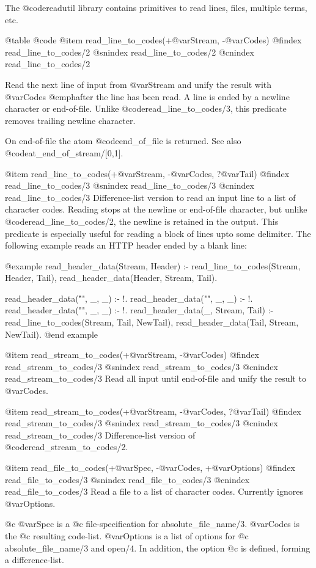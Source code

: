{{{{{{{{{The @code{readutil} library contains primitives to read lines, files,
multiple terms, etc.

@table @code
@item read_line_to_codes(+@var{Stream}, -@var{Codes})
@findex read_line_to_codes/2
@snindex read_line_to_codes/2
@cnindex read_line_to_codes/2

Read the next line of input from @var{Stream} and unify the result with
@var{Codes} @emph{after} the line has been read.  A line is ended by a
newline character or end-of-file. Unlike @code{read_line_to_codes/3},
this predicate removes trailing newline character.

On end-of-file the atom @code{end_of_file} is returned.  See also
@code{at_end_of_stream/[0,1]}.

@item read_line_to_codes(+@var{Stream}, -@var{Codes}, ?@var{Tail})
@findex read_line_to_codes/3
@snindex read_line_to_codes/3
@cnindex read_line_to_codes/3
Difference-list version to read an input line to a list of character
codes.  Reading stops at the newline or end-of-file character, but
unlike @code{read_line_to_codes/2}, the newline is retained in the
output.  This predicate is especially useful for reading a block of
lines upto some delimiter.  The following example reads an HTTP header
ended by a blank line:

@example
read_header_data(Stream, Header) :-
	read_line_to_codes(Stream, Header, Tail),
	read_header_data(Header, Stream, Tail).

read_header_data("\r\n", _, _) :- !.
read_header_data("\n", _, _) :- !.
read_header_data("", _, _) :- !.
read_header_data(_, Stream, Tail) :-
	read_line_to_codes(Stream, Tail, NewTail),
	read_header_data(Tail, Stream, NewTail).
@end example

@item read_stream_to_codes(+@var{Stream}, -@var{Codes})
@findex read_stream_to_codes/3
@snindex read_stream_to_codes/3
@cnindex read_stream_to_codes/3
Read all input until end-of-file and unify the result to @var{Codes}.

@item read_stream_to_codes(+@var{Stream}, -@var{Codes}, ?@var{Tail})
@findex read_stream_to_codes/3
@snindex read_stream_to_codes/3
@cnindex read_stream_to_codes/3
Difference-list version of @code{read_stream_to_codes/2}.

@item read_file_to_codes(+@var{Spec}, -@var{Codes}, +@var{Options})
@findex read_file_to_codes/3
@snindex read_file_to_codes/3
@cnindex read_file_to_codes/3
Read a file to a list of character codes. Currently ignores
@var{Options}.

@c  @var{Spec} is a
@c file-specification for absolute_file_name/3.  @var{Codes} is the
@c resulting code-list.  @var{Options} is a list of options for
@c absolute_file_name/3 and open/4.  In addition, the option
@c  is defined, forming a difference-list.

}}}}}}}}}

